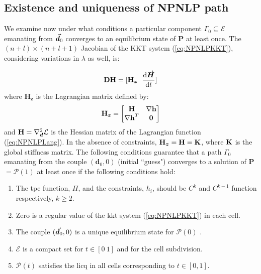 \subsection{Existence and uniqueness of NPNLP path}\label{CH4-S2SS1}

We examine now under what conditions a particular component
$\mathit{\Gamma_0}\subseteq{\mathcal{E}}$ emanating from $\vec{\boldsymbol{d}}_0$ converges 
to an
equilibrium state of \textbf{P} at least once. The $(n+l)\times(n+l+1)$ 
Jacobian of the KKT system
(\ref{eq:NPNLPKKT}), considering variations in $\lambda$ as well, is:

\begin{equation}
	\bmat{DH} = [\bmat{H}_{\bm{z}}\ \ \frac{\text{d}\bvec{H}}{\text{d}t}]
	\label{eq:NPNLP-J}
\end{equation}
\noindent where $\bm{H}_{\bm{z}}$ is the Lagrangian matrix defined
by:
\begin{equation}
	\mathbf{H}_{\bm{z}} = \begin{bmatrix}
		\mathbf{H} & \mathbf{\nabla h}\\
		\mathbf{\nabla h}^T & \mathbf{0}
	\end{bmatrix}
	\label{eq:LagrangianMatrix}
\end{equation}
and $\mathbf{H}= \nabla_{\bm{d}}^2\mathcal{L}$ is the Hessian matrix of the 
Lagrangian function
(\ref{eq:NPNLPLang}). In the absence of constraints, 
$\mathbf{H}_{\bm{z}}=\mathbf{H}=\mathbf{K}$,
where $\mathbf{K}$ is the global stiffness matrix. The following conditions
guarantee that a path $\mathit{\Gamma_0}$ emanating 
from the couple $(\bm{d}_0,0)$ (initial ``guess") converges
to a solution of \textbf{P} $=\bm{\mathcal{P}}(1)$ at least once if the 
following
conditions hold\cite{Gfrerer:1985}:
\begin{enumerate}
	\item The \acrshort{tpe} function, $\Pi$, and the constraints, $h_i$, 
	should be $C^k$
	and $C^{k-1}$ function respectively, $k\geq 2$.
	\item Zero is a regular value of the \acrshort{kkt} system 
	(\ref{eq:NPNLPKKT}) in each
	cell.
	\item The couple $(\vec{\boldsymbol{d}}_0,0)$ is a unique equilibrium state for
	$\bm{\mathcal{P}}(0)$ .
	\item $\mathcal{E}$ is a compact set for $t\in[0\ 1]$ and for the cell
	subdivision.
	\item $\bm{\mathcal{P}}(t)$ satisfies the \acrshort{licq} in all 
	cells corresponding to $t\in[0,1]$.
\end{enumerate}

